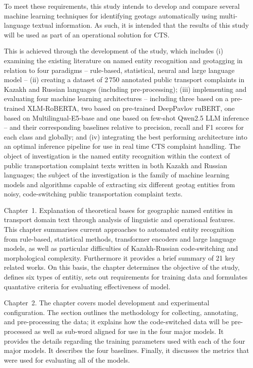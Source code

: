 To meet these requirements, this study intends to develop and compare several machine learning techniques for identifying geotags automatically using multi-language textual information. As such, it is intended that the results of this study will be used as part of an operational solution for CTS.

This is achieved through the development of the study, which includes (i) examining the existing literature on named entity recognition and geotagging in relation to four paradigms -- rule-based, statistical, neural and large language model -- (ii) creating a dataset of 2\,750 annotated public transport complaints in Kazakh and Russian languages (including pre-processing); (iii) implementing and evaluating four machine learning architectures -- including three based on a pre-trained XLM-RoBERTA, two based on pre-trained DeepPavlov ruBERT, one based on Multilingual-E5-base and one based on few-shot Qwen2.5 LLM inference -- and their corresponding baselines relative to precision, recall and F1 scores for each class and globally; and (iv) integrating the best performing architecture into an optimal inference pipeline for use in real time CTS complaint handling. 
The object of investigation is the named entity recognition within the context of public transportation complaint texts written in both Kazakh and Russian languages; the subject of the investigation is the family of machine learning models and algorithms capable of extracting six different geotag entities from noisy, code-switching public transportation complaint texts.

Chapter~1. Explanation of theoretical bases for geographic named entities in transport domain text through analysis of linguistic and operational features. This chapter summarises current approaches to automated entity recognition from rule-based, statistical methods, transformer encoders and large language models, as well as particular difficulties of Kazakh-Russian code-switching and morphological complexity. Furthermore it provides a brief summary of 21 key related works. On this basis, the chapter determines the objective of the study, defines six types of entitiy, sets out requirements for training data and formulates quantative criteria for evaluating effectiveness of model.

Chapter~2. The chapter covers model development and experimental configuration. The section outlines the methodology for collecting, annotating, and pre-processing the data; it explains how the code-switched data will be pre-processed as well as sub-word aligned for use in the four major models. It provides the details regarding the training parameters used with each of the four major models. It describes the four baselines. Finally, it discusses the metrics that were used for evaluating all of the models.

